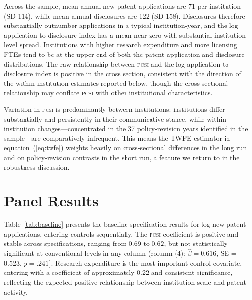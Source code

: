 \documentclass[12pt]{article}
\newcommand{\PCSI}{\textsc{pcsi}}
\begin{document}
Across the sample, mean annual new patent applications are 71 per institution (SD 114),
while mean annual disclosures are 122 (SD 158). Disclosures therefore substantially
outnumber applications in a typical institution-year, and the log application-to-disclosure
index has a mean near zero with substantial institution-level spread. Institutions with
higher research expenditure and more licensing FTEs tend to be at the upper end of both
the patent-application and disclosure distributions. The raw relationship between \PCSI{}
and the log application-to-disclosure index is positive in the cross section, consistent
with the direction of the within-institution estimates reported below, though the
cross-sectional relationship may conflate \PCSI{} with other institutional characteristics.

Variation in \PCSI{} is predominantly between institutions: institutions differ
substantially and persistently in their communicative stance, while within-institution
changes---concentrated in the 37 policy-revision years identified in the sample---are
comparatively infrequent. This means the TWFE estimator in equation~(\ref{eq:twfe})
weights heavily on cross-sectional differences in the long run and on policy-revision
contrasts in the short run, a feature we return to in the robustness discussion.

\section{Panel Results}
\label{sec:results}

Table~\ref{tab:baseline} presents the baseline specification results for log new patent
applications, entering controls sequentially. The \PCSI{} coefficient is positive and
stable across specifications, ranging from 0.69 to 0.62, but not statistically significant
at conventional levels in any column (column (4): $\hat\beta = 0.616$, SE = 0.523,
$p = .241$). Research expenditure is the most important control covariate, entering with
a coefficient of approximately 0.22 and consistent significance, reflecting the expected
positive relationship between institution scale and patent activity.
\end{document}
